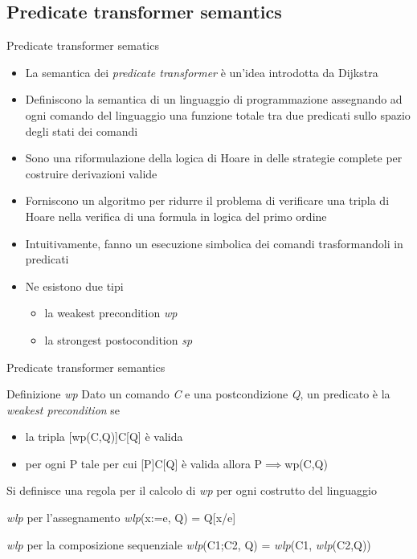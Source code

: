\documentclass[]{beamer}
\begin{document}
\subsection{Predicate transformer semantics}
\begin{frame}{Predicate transformer sematics}
\begin{itemize}
    \item La semantica dei \textit{predicate transformer} è un'idea introdotta da Dijkstra
    \item Definiscono la semantica di un linguaggio di programmazione assegnando ad ogni comando del linguaggio una funzione totale tra due predicati sullo spazio degli stati dei comandi
    \item Sono una riformulazione della logica di Hoare in delle strategie complete per costruire derivazioni valide
    \item Forniscono un algoritmo per ridurre il problema di verificare una tripla di Hoare nella verifica di una formula in logica del primo ordine
    \item Intuitivamente, fanno un esecuzione simbolica dei comandi trasformandoli in predicati
    \item Ne esistono due tipi \begin{itemize}
        \item la weakest precondition \textit{wp}
        \item la strongest postocondition \textit{sp}
    \end{itemize}
\end{itemize}
\end{frame}

\begin{frame}[t]{Predicate transformer semantics}
\begin{center}
    \begin{block}{Definizione \textit{wp}}
        Dato un comando \textit{C} e una postcondizione \textit{Q}, un predicato è la \textit{weakest precondition} se
        \begin{itemize}
            \item la tripla [wp(C,Q)]C[Q] è valida
            \item per ogni P tale per cui [P]C[Q] è valida allora P$\implies$wp(C,Q)
        \end{itemize}
    \end{block}
\end{center}
Si definisce una regola per il calcolo di \textit{wp} per ogni costrutto del linguaggio
\begin{center}
    \begin{block}{\textit{wlp} per l'assegnamento}
        \textit{wlp}(x:=e, Q) = Q[x/e]
    \end{block}
    \begin{block}{\textit{wlp} per la composizione sequenziale}
        \textit{wlp}(C1;C2, Q) = \textit{wlp}(C1, \textit{wlp}(C2,Q))
    \end{block}
\end{center}
\end{frame}
\end{document}
